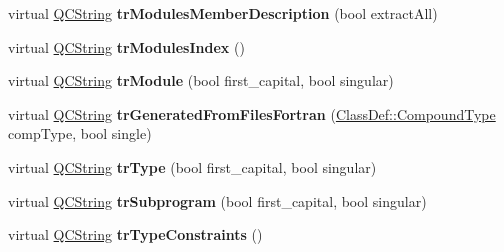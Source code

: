 \begin{DoxyCompactItemize}
\item 
\hypertarget{class_translator_adapter__1__5__4_a26dd0f47c7f59841f901da7f4bd19306}{virtual \hyperlink{class_q_c_string}{Q\-C\-String} {\bfseries tr\-Modules\-Member\-Description} (bool extract\-All)}\label{class_translator_adapter__1__5__4_a26dd0f47c7f59841f901da7f4bd19306}

\item 
\hypertarget{class_translator_adapter__1__5__4_a8a71cbe9e0669d3555731c3ebc0aae35}{virtual \hyperlink{class_q_c_string}{Q\-C\-String} {\bfseries tr\-Modules\-Index} ()}\label{class_translator_adapter__1__5__4_a8a71cbe9e0669d3555731c3ebc0aae35}

\item 
\hypertarget{class_translator_adapter__1__5__4_a894e0b632e1680e918c78fea5b9b5384}{virtual \hyperlink{class_q_c_string}{Q\-C\-String} {\bfseries tr\-Module} (bool first\-\_\-capital, bool singular)}\label{class_translator_adapter__1__5__4_a894e0b632e1680e918c78fea5b9b5384}

\item 
\hypertarget{class_translator_adapter__1__5__4_ab89226b80b72b0ff8f4fca99626097ba}{virtual \hyperlink{class_q_c_string}{Q\-C\-String} {\bfseries tr\-Generated\-From\-Files\-Fortran} (\hyperlink{class_class_def_a768a6f0a6fd7e9087ff7971abbcc3f36}{Class\-Def\-::\-Compound\-Type} comp\-Type, bool single)}\label{class_translator_adapter__1__5__4_ab89226b80b72b0ff8f4fca99626097ba}

\item 
\hypertarget{class_translator_adapter__1__5__4_a2763a6af55d1ca03be54604c2bc4a3b4}{virtual \hyperlink{class_q_c_string}{Q\-C\-String} {\bfseries tr\-Type} (bool first\-\_\-capital, bool singular)}\label{class_translator_adapter__1__5__4_a2763a6af55d1ca03be54604c2bc4a3b4}

\item 
\hypertarget{class_translator_adapter__1__5__4_aeceda8d8c2b8645fd2337cb38d293269}{virtual \hyperlink{class_q_c_string}{Q\-C\-String} {\bfseries tr\-Subprogram} (bool first\-\_\-capital, bool singular)}\label{class_translator_adapter__1__5__4_aeceda8d8c2b8645fd2337cb38d293269}

\item 
\hypertarget{class_translator_adapter__1__5__4_a196f3eb690f2748ee71f518cf02bd7fe}{virtual \hyperlink{class_q_c_string}{Q\-C\-String} {\bfseries tr\-Type\-Constraints} ()}\label{class_translator_adapter__1__5__4_a196f3eb690f2748ee71f518cf02bd7fe}

\end{DoxyCompactItemize}
